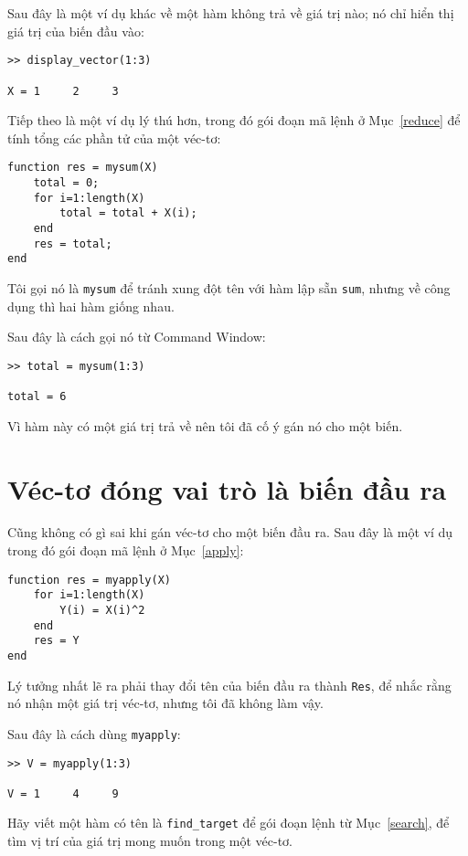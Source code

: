 \documentclass[12pt]{book}
\begin{document}
Sau đây là một ví dụ khác về một hàm không trả về giá trị nào;
nó chỉ hiển thị giá trị của biến đầu vào:

\begin{verbatim}
>> display_vector(1:3)

X = 1     2     3
\end{verbatim}
%
Tiếp theo là một ví dụ lý thú hơn, trong đó gói đoạn mã lệnh ở
Mục~\ref{reduce} để tính tổng các phần tử của một véc-tơ:

\begin{verbatim}
function res = mysum(X)
    total = 0;
    for i=1:length(X)
        total = total + X(i);
    end
    res = total;
end
\end{verbatim}
%
Tôi gọi nó là {\tt mysum} để tránh xung đột tên với hàm lập sẵn
{\tt sum}, nhưng về công dụng thì hai hàm giống nhau.

Sau đây là cách gọi nó từ Command Window:

\begin{verbatim}
>> total = mysum(1:3)

total = 6
\end{verbatim}
%
Vì hàm này có một giá trị trả về nên tôi đã cố ý gán nó cho một
biến.


\section{Véc-tơ đóng vai trò là biến đầu ra}

Cũng không có gì sai khi gán véc-tơ cho một biến đầu ra. Sau đây
là một ví dụ trong đó gói đoạn mã lệnh ở Mục~\ref{apply}:

\begin{verbatim}
function res = myapply(X)
    for i=1:length(X)
        Y(i) = X(i)^2
    end
    res = Y
end
\end{verbatim}
%
Lý tưởng nhất lẽ ra phải thay đổi tên của biến đầu ra thành
{\tt Res}, để nhắc rằng nó nhận một giá trị véc-tơ, nhưng
tôi đã không làm vậy.

Sau đây là cách dùng {\tt myapply}:

\begin{verbatim}
>> V = myapply(1:3)

V = 1     4     9
\end{verbatim}
%
\begin{ex}
Hãy viết một hàm có tên là \verb#find_target# để gói đoạn lệnh
từ Mục~\ref{search}, để tìm vị trí của giá trị mong muốn trong
một véc-tơ.
\end{ex}
\end{document}
